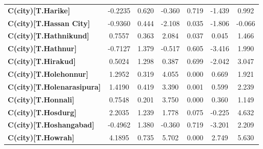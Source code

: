 \begin{center}
\begin{tabular}{lcccccc}
\textbf{C(city)[T.Harike]}                                                                          &      -0.2235  &        0.620     &    -0.360  &         0.719        &       -1.439    &        0.992     \\
\textbf{C(city)[T.Hassan City]}                                                                     &      -0.9360  &        0.444     &    -2.108  &         0.035        &       -1.806    &       -0.066     \\
\textbf{C(city)[T.Hathnikund]}                                                                      &       0.7557  &        0.363     &     2.084  &         0.037        &        0.045    &        1.466     \\
\textbf{C(city)[T.Hathnur]}                                                                         &      -0.7127  &        1.379     &    -0.517  &         0.605        &       -3.416    &        1.990     \\
\textbf{C(city)[T.Hirakud]}                                                                         &       0.5024  &        1.298     &     0.387  &         0.699        &       -2.042    &        3.047     \\
\textbf{C(city)[T.Holehonnur]}                                                                      &       1.2952  &        0.319     &     4.055  &         0.000        &        0.669    &        1.921     \\
\textbf{C(city)[T.Holenarasipura]}                                                                  &       1.4190  &        0.419     &     3.390  &         0.001        &        0.599    &        2.239     \\
\textbf{C(city)[T.Honnali]}                                                                         &       0.7548  &        0.201     &     3.750  &         0.000        &        0.360    &        1.149     \\
\textbf{C(city)[T.Hosdurg]}                                                                         &       2.2035  &        1.239     &     1.778  &         0.075        &       -0.225    &        4.632     \\
\textbf{C(city)[T.Hoshangabad]}                                                                     &      -0.4962  &        1.380     &    -0.360  &         0.719        &       -3.201    &        2.209     \\
\textbf{C(city)[T.Howrah]}                                                                          &       4.1895  &        0.735     &     5.702  &         0.000        &        2.749    &        5.630     \\

\end{tabular}
\end{center}
